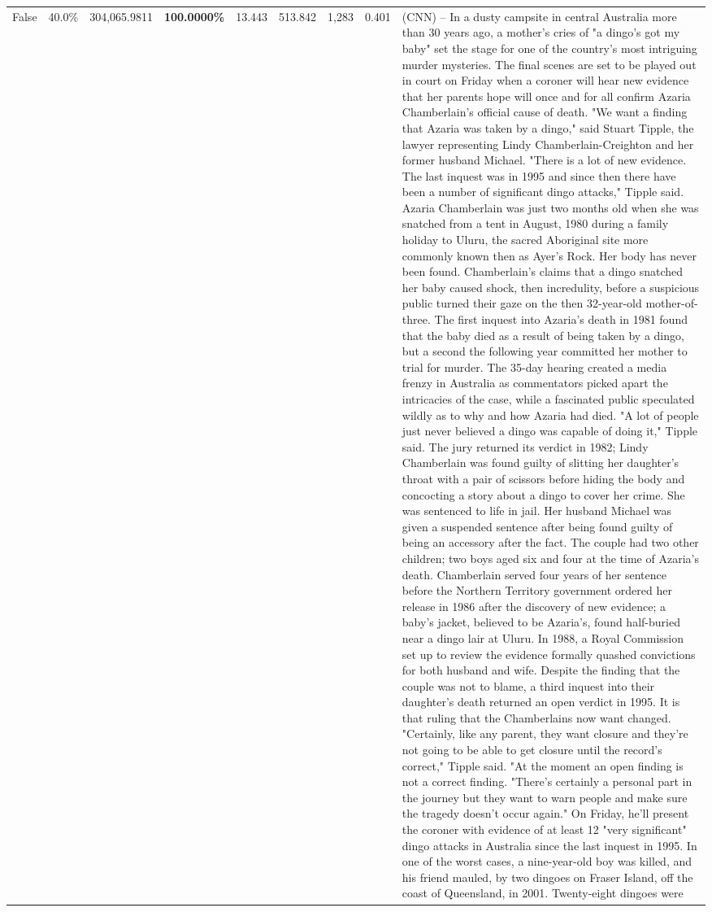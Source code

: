 \begin{table}[H]
\begin{tabular}{lllrlllll}
False & 40.0\% & 304,065.9811 & \bfseries \color{red} 100.0000\% & 13.443 & 513.842 & 1,283 & 0.401 & (CNN) -- In a dusty campsite in central Australia more than 30 years ago, a mother's cries of "a dingo's got my baby" set the stage for one of the country's most intriguing murder mysteries. The final scenes are set to be played out in court on Friday when a coroner will hear new evidence that her parents hope will once and for all confirm Azaria Chamberlain's official cause of death. "We want a finding that Azaria was taken by a dingo," said Stuart Tipple, the lawyer representing Lindy Chamberlain-Creighton and her former husband Michael. "There is a lot of new evidence. The last inquest was in 1995 and since then there have been a number of significant dingo attacks," Tipple said. Azaria Chamberlain was just two months old when she was snatched from a tent in August, 1980 during a family holiday to Uluru, the sacred Aboriginal site more commonly known then as Ayer's Rock. Her body has never been found. Chamberlain's claims that a dingo snatched her baby caused shock, then incredulity, before a suspicious public turned their gaze on the then 32-year-old mother-of-three. The first inquest into Azaria's death in 1981 found that the baby died as a result of being taken by a dingo, but a second the following year committed her mother to trial for murder. The 35-day hearing created a media frenzy in Australia as commentators picked apart the intricacies of the case, while a fascinated public speculated wildly as to why and how Azaria had died. "A lot of people just never believed a dingo was capable of doing it," Tipple said. The jury returned its verdict in 1982; Lindy Chamberlain was found guilty of slitting her daughter's throat with a pair of scissors before hiding the body and concocting a story about a dingo to cover her crime. She was sentenced to life in jail. Her husband Michael was given a suspended sentence after being found guilty of being an accessory after the fact. The couple had two other children; two boys aged six and four at the time of Azaria's death. Chamberlain served four years of her sentence before the Northern Territory government ordered her release in 1986 after the discovery of new evidence; a baby's jacket, believed to be Azaria's, found half-buried near a dingo lair at Uluru. In 1988, a Royal Commission set up to review the evidence formally quashed convictions for both husband and wife. Despite the finding that the couple was not to blame, a third inquest into their daughter's death returned an open verdict in 1995. It is that ruling that the Chamberlains now want changed. "Certainly, like any parent, they want closure and they're not going to be able to get closure until the record's correct," Tipple said. "At the moment an open finding is not a correct finding. "There's certainly a personal part in the journey but they want to warn people and make sure the tragedy doesn't occur again." On Friday, he'll present the coroner with evidence of at least 12 "very significant" dingo attacks in Australia since the last inquest in 1995. In one of the worst cases, a nine-year-old boy was killed, and his friend mauled, by two dingoes on Fraser Island, off the coast of Queensland, in 2001. Twenty-eight dingoes were 
\end{tabular}
\end{table}
